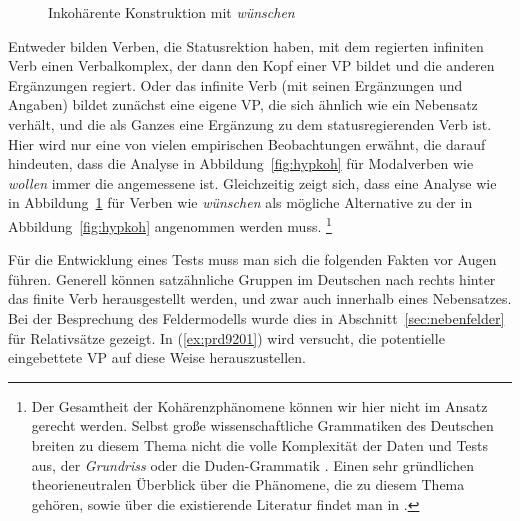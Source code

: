 \begin{figure}
  \caption{Inkohärente Konstruktion mit \textit{wünschen}}
  \label{fig:hypinkoh}
\end{figure}

Entweder bilden Verben, die Statusrektion haben, mit dem regierten infiniten Verb einen Verbalkomplex, der dann den Kopf einer VP bildet und die anderen Ergänzungen regiert.
Oder das infinite Verb (mit seinen Ergänzungen und Angaben) bildet zunächst eine eigene VP, die sich ähnlich wie ein Nebensatz verhält, und die als Ganzes eine Ergänzung zu dem statusregierenden Verb ist.
Hier wird nur eine von vielen empirischen Beobachtungen erwähnt, die darauf hindeuten, dass die Analyse in Abbildung~\ref{fig:hypkoh} für Modalverben wie \textit{wollen} immer die angemessene ist.
Gleichzeitig zeigt sich, dass eine Analyse wie in Abbildung~\ref{fig:hypinkoh} für Verben wie \textit{wünschen} als mögliche Alternative zu der in Abbildung~\ref{fig:hypkoh} angenommen werden muss.%
\footnote{Der Gesamtheit der Kohärenzphänomene können wir hier nicht im Ansatz gerecht werden.
Selbst große wissenschaftliche Grammatiken des Deutschen breiten zu diesem Thema nicht die volle Komplexität der Daten und Tests aus, \zB der \textit{Grundriss} \citep[359--361]{Eisenberg2} oder die Duden-Grammatik \citep[§1314--§1323]{Duden8}.
Einen sehr gründlichen theorieneutralen Überblick über die Phänomene, die zu diesem Thema gehören, sowie über die existierende Literatur findet man in \citet[253--275]{Mueller08}.
}

Für die Entwicklung eines Tests muss man sich die folgenden Fakten vor Augen führen.
Generell können satzähnliche Gruppen im Deutschen nach rechts hinter das finite Verb herausgestellt werden, und zwar auch innerhalb eines Nebensatzes.
Bei der Besprechung des Feldermodells wurde dies in Abschnitt~\ref{sec:nebenfelder} \zB für Relativsätze gezeigt.
In (\ref{ex:prd9201}) wird versucht, die potentielle eingebettete VP auf diese Weise herauszustellen.

